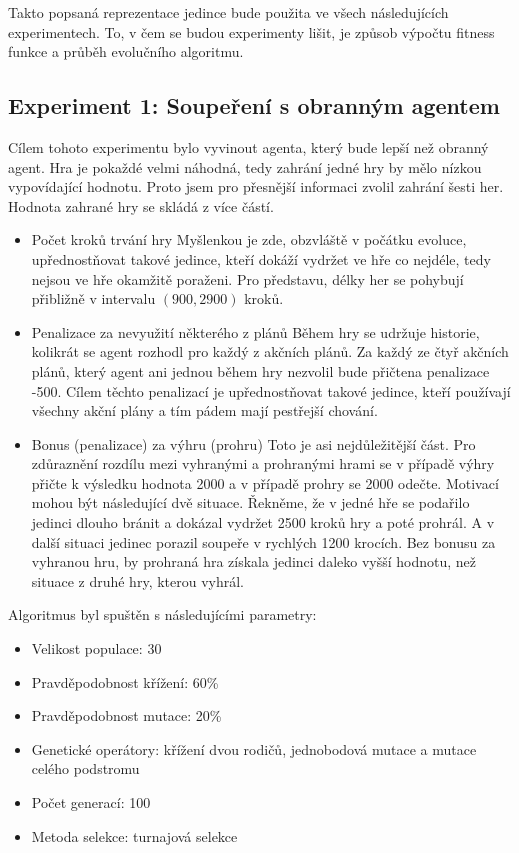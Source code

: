 Takto popsaná reprezentace jedince bude použita ve všech následujících experimentech. To, v čem se budou experimenty lišit, je způsob výpočtu fitness funkce a průběh evolučního algoritmu.

\subsection{Experiment 1: Soupeření s obranným agentem}
Cílem tohoto experimentu bylo vyvinout agenta, který bude lepší než obranný agent.
Hra je pokaždé velmi náhodná, tedy zahrání jedné hry by mělo nízkou vypovídající hodnotu. Proto jsem pro přesnější informaci zvolil zahrání šesti her.
Hodnota zahrané hry se skládá z více částí.
\begin{itemize}
    \item Počet kroků trvání hry
        \newline
        Myšlenkou je zde, obzvláště v počátku evoluce, upřednostňovat takové jedince, kteří dokáží vydržet ve hře co nejdéle, tedy nejsou ve hře okamžitě poraženi.
        Pro představu, délky her se pohybují přibližně v intervalu $(900, 2900)$ kroků.
    \item Penalizace za nevyužití některého z plánů
        \newline
        Během hry se udržuje historie, kolikrát se agent rozhodl pro každý z akčních plánů.
        Za každý ze čtyř akčních plánů, který agent ani jednou během hry nezvolil bude přičtena penalizace -500. Cílem těchto penalizací je upřednostňovat takové jedince, kteří používají všechny akční plány a tím pádem mají pestřejší chování. 
    \item Bonus (penalizace) za výhru (prohru)
        \newline
        Toto je asi nejdůležitější část. Pro zdůraznění rozdílu mezi vyhranými a prohranými hrami se v případě výhry přičte k výsledku hodnota 2000 a v případě prohry se 2000 odečte.
        Motivací mohou být následující dvě situace. Řekněme, že v jedné hře se podařilo jedinci dlouho bránit a dokázal vydržet 2500 kroků hry a poté prohrál. A v další situaci jedinec porazil soupeře v rychlých 1200 krocích. 
        Bez bonusu za vyhranou hru, by prohraná hra získala jedinci daleko vyšší hodnotu, než situace z druhé hry, kterou vyhrál.        
    
\end{itemize}

Algoritmus byl spuštěn s následujícími parametry:
\begin{itemize}
    \item Velikost populace: 30
    \item Pravděpodobnost křížení: 60\%
    \item Pravděpodobnost mutace: 20\%
    \item Genetické operátory: křížení dvou rodičů, jednobodová mutace a mutace celého podstromu
    \item Počet generací: 100
    \item Metoda selekce: turnajová selekce
\end{itemize}

